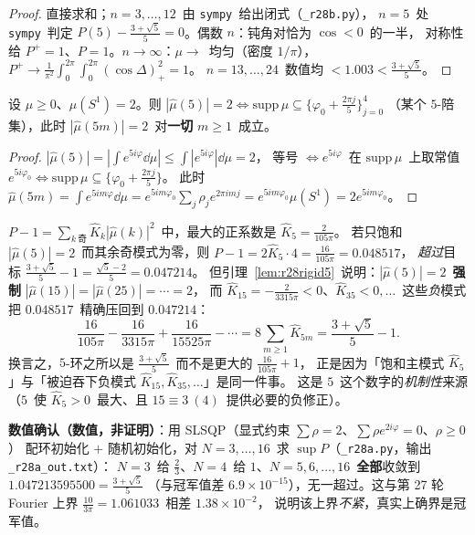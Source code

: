 \begin{proof}
直接求和；$n=3,\dots,12$~由 \texttt{sympy}~给出闭式（\texttt{\_r28b.py}），
$n=5$~处 \texttt{sympy}~判定 $P(5)-\frac{3+\sqrt5}5=0$。偶数 $n$：钝角对恰为 $\cos<0$~的一半，
对称性给 $P^+=1$、$P=1$。$n\to\infty$：$\mu\to$~均匀（密度 $1/\pi$），
$P^+\to\frac1{\pi^2}\int_0^{2\pi}\!\!\int_0^{2\pi}(\cos\Delta)_+^2=1$。
$n=13,\dots,24$~数值均 $<1.003<\frac{3+\sqrt5}5$。
\end{proof}

\begin{lemma}[$|\widehat\mu(5)|=2$~的刚性，已证]\label{lem:r28rigid5}
设 $\mu\ge0$、$\mu(S^1)=2$。则 $|\widehat\mu(5)|=2\iff\mathrm{supp}\,\mu\subseteq\{\varphi_0+\tfrac{2\pi j}5\}_{j=0}^4$
（某个 $5$-陪集），此时 $|\widehat\mu(5m)|=2$~对\textbf{一切} $m\ge1$~成立。
\end{lemma}

\begin{proof}
$|\widehat\mu(5)|=|\int e^{5i\varphi}\dd\mu|\le\int|e^{5i\varphi}|\dd\mu=2$，
等号 $\iff e^{5i\varphi}$~在 $\mathrm{supp}\,\mu$~上取常值 $e^{5i\varphi_0}\iff\mathrm{supp}\,\mu\subseteq\{\varphi_0+\frac{2\pi j}5\}$。
此时 $\widehat\mu(5m)=\int e^{5im\varphi}\dd\mu=e^{5im\varphi_0}\sum_j\rho_je^{2\pi imj}=e^{5im\varphi_0}\mu(S^1)=2e^{5im\varphi_0}$。
\end{proof}

\begin{remark}\label{rem:r28why5}
$P-1=\sum_{k\ \text{奇}}\widehat K_k|\widehat\mu(k)|^2$~中，最大的正系数是 $\widehat K_5=\frac2{105\pi}$。
若只饱和 $|\widehat\mu(5)|=2$~而其余奇模式为零，则 $P-1=2\widehat K_5\cdot4=\frac{16}{105\pi}=0.048517$，
\emph{超过}目标 $\frac{3+\sqrt5}5-1=\frac{\sqrt5-2}5=0.047214$。
但引理~\ref{lem:r28rigid5}~说明：$|\widehat\mu(5)|=2$~\textbf{强制} $|\widehat\mu(15)|=|\widehat\mu(25)|=\cdots=2$，
而 $\widehat K_{15}=-\frac2{3315\pi}<0$、$\widehat K_{35}<0,\dots$~这些\emph{负}模式把
$0.048517$~精确压回到 $0.047214$：
\[
\frac{16}{105\pi}-\frac{16}{3315\pi}+\frac{16}{15525\pi}-\cdots
=8\sum_{m\ge1}\widehat K_{5m}=\frac{3+\sqrt5}5-1 .
\]
换言之，$5$-环之所以是 $\frac{3+\sqrt5}5$~而不是更大的 $\frac{16}{105\pi}+1$，
正是因为「饱和主模式 $\widehat K_5$」与「被迫吞下负模式 $\widehat K_{15},\widehat K_{35},\dots$」是同一件事。
这是 $5$~这个数字的\emph{机制性}来源（$5$~使 $\widehat K_5>0$~最大、且 $15\equiv3\ (4)$~提供必要的负修正）。
\end{remark}

\textbf{数值确认（数值，非证明）}：用 SLSQP（显式约束 $\sum\rho=2$、$\sum\rho e^{2i\varphi}=0$、$\rho\ge0$）
配环初始化 $+$ 随机初始化，对 $N=3,\dots,16$~求 $\sup P$（\texttt{\_r28a.py}，输出 \texttt{\_r28a\_out.txt}）：
$N=3$~给 $\frac23$、$N=4$~给 $1$、$N=5,6,\dots,16$~\textbf{全部}收敛到 $1.047213595500=\frac{3+\sqrt5}5$
（与冠军值差 $6.9\times10^{-15}$），无一超过。这与第 27 轮 Fourier 上界 $\frac{10}{3\pi}=1.061033$~相差 $1.38\times10^{-2}$，
说明该上界\emph{不紧}，真实上确界是冠军值。

